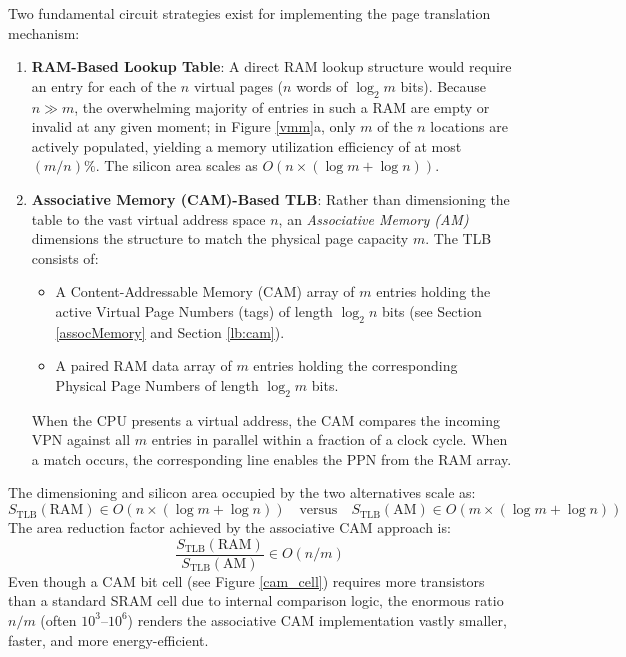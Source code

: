 Two fundamental circuit strategies exist for implementing the page translation mechanism:
\begin{enumerate}
    \item \textbf{RAM-Based Lookup Table}: A direct RAM lookup structure would require an entry for each of the $n$ virtual pages ($n$ words of $\log_2 m$ bits). Because $n \gg m$, the overwhelming majority of entries in such a RAM are empty or invalid at any given moment; in Figure \ref{vmm}a, only $m$ of the $n$ locations are actively populated, yielding a memory utilization efficiency of at most $(m/n)\%$. The silicon area scales as $O(n \times (\log m + \log n))$.
    
    \item \textbf{Associative Memory (CAM)-Based TLB}: Rather than dimensioning the table to the vast virtual address space $n$, an \textit{Associative Memory (AM)} dimensions the structure to match the physical page capacity $m$. The TLB consists of:
    \begin{itemize}
        \item A Content-Addressable Memory (CAM) array of $m$ entries holding the active Virtual Page Numbers (tags) of length $\log_2 n$ bits (see Section \ref{assocMemory} and Section \ref{lb:cam}).
        \item A paired RAM data array of $m$ entries holding the corresponding Physical Page Numbers of length $\log_2 m$ bits.
    \end{itemize}
    When the CPU presents a virtual address, the CAM compares the incoming VPN against all $m$ entries in parallel within a fraction of a clock cycle. When a match occurs, the corresponding line enables the PPN from the RAM array.
\end{enumerate}

The dimensioning and silicon area occupied by the two alternatives scale as:
\begin{equation}
S_{\text{TLB}}(\text{RAM}) \in O(n \times (\log m + \log n)) \quad \text{versus} \quad S_{\text{TLB}}(\text{AM}) \in O(m \times (\log m + \log n))
\end{equation}
The area reduction factor achieved by the associative CAM approach is:
\begin{equation}
\frac{S_{\text{TLB}}(\text{RAM})}{S_{\text{TLB}}(\text{AM})} \in O(n/m)
\end{equation}
Even though a CAM bit cell (see Figure \ref{cam_cell}) requires more transistors than a standard SRAM cell due to internal comparison logic, the enormous ratio $n/m$ (often $10^3\text{--}10^6$) renders the associative CAM implementation vastly smaller, faster, and more energy-efficient.

